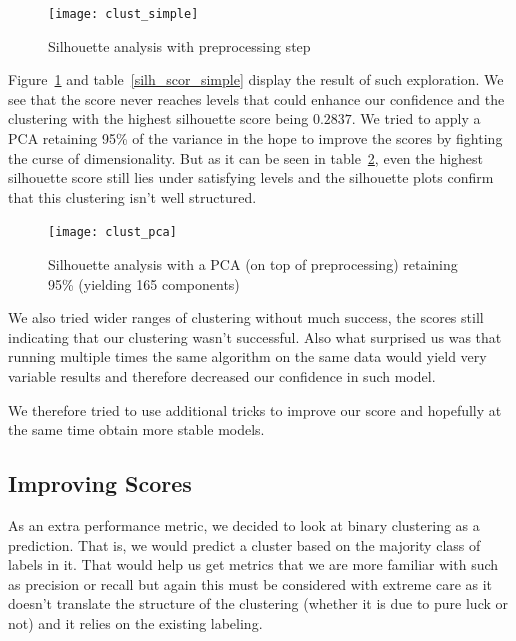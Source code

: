\begin{figure}[ht]
    \begin{center}
    \texttt{[image: clust\_simple]}
    \end{center}
    \caption{Silhouette analysis with preprocessing step}
    \label{clust_simple}
\end{figure}

Figure~\ref{clust_simple} and table~\ref{silh_scor_simple} display the result of such exploration. We see that the score never reaches levels that could enhance our confidence and the clustering with the highest silhouette score being $0.2837$. We tried to apply a PCA retaining 95\% of the variance in the hope to improve the scores by fighting the curse of dimensionality. But as it can be seen in table~\ref{clust_pca}, even the highest silhouette score still lies under satisfying levels and the silhouette plots confirm that this clustering isn't well structured.   

\begin{figure}[ht]
    \begin{center}
    \texttt{[image: clust\_pca]}
    \end{center}
    \caption{Silhouette analysis with a PCA (on top of preprocessing) retaining 95\% (yielding 165 components)}
    \label{clust_pca}
\end{figure}

We also tried wider ranges of clustering without much success, the scores still indicating that our clustering wasn't successful. Also what surprised us was that running multiple times the same algorithm on the same data would yield very variable results and therefore decreased our confidence in such model. 

We therefore tried to use additional tricks to improve our score and hopefully at the same time obtain more stable models. 

\subsection{Improving Scores}
As an extra performance metric, we decided to look at binary clustering as a prediction. That is, we would predict a cluster based on the majority class of labels in it. That would help us get metrics that we are more familiar with such as precision or recall but again this must be considered with extreme care as it doesn't translate the structure of the clustering (whether it is due to pure luck or not) and it relies on the existing labeling.

